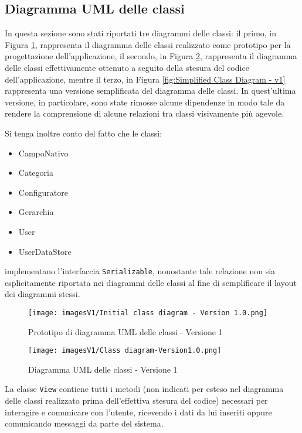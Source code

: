 \newpage
\subsection{Diagramma UML delle classi}
In questa sezione sono stati riportati tre diagrammi delle classi: il primo, in Figura \ref{fig:Initial Class diagram - v1}, rappresenta il diagramma delle classi realizzato come prototipo per la progettazione dell'applicazione, il secondo, in Figura \ref{fig:Class diagram - v1}, rappresenta il diagramma delle classi effettivamente ottenuto a seguito della stesura del codice dell'applicazione, mentre il terzo, in Figura \ref{fig:Simplified Class Diagram - v1} rappresenta una versione semplificata del diagramma delle classi. In quest'ultima versione, in particolare, sono state rimosse alcune dipendenze in modo tale da rendere la comprensione di alcune relazioni tra classi visivamente più agevole.

Si tenga inoltre conto del fatto che le classi:
\begin{itemize}
    \item CampoNativo
    \item Categoria
    \item Configuratore
    \item Gerarchia
    \item User
    \item UserDataStore
\end{itemize}
implementano l'interfaccia \texttt{Serializable}, nonostante tale relazione non sia esplicitamente riportata nei diagrammi delle classi al fine di semplificare il layout dei diagrammi stessi.

\begin{figure}[hb]
    \centering
    \texttt{[image: imagesV1/Initial class diagram - Version 1.0.png]}
    \caption{\label{fig:Initial Class diagram - v1}Prototipo di diagramma UML delle classi - Versione 1}
\end{figure}

\begin{figure}[h!]
    \centering
    \texttt{[image: imagesV1/Class diagram-Version1.0.png]}
    \caption{\label{fig:Class diagram - v1}Diagramma UML delle classi - Versione 1}
\end{figure}    

La classe \texttt{View} contiene tutti i metodi (non indicati per esteso nel diagramma delle classi realizzato prima dell'effettiva stesura del codice) necessari per interagire e comunicare con l'utente, ricevendo i dati da lui inseriti oppure comunicando messaggi da parte del sistema.

